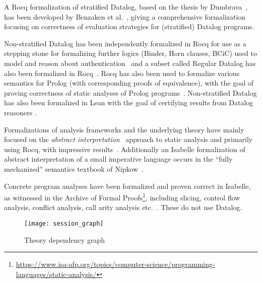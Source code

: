 \documentclass[10pt,a4paper]{article}
\begin{document}
A Rocq formalization of stratified Datalog, based on the thesis by
Dumbrava~\cite{DBLP:phd/hal/Dumbrava16}, has been developed by
Benzaken et al.~\cite{DBLP:conf/itp/BenzakenCD17}, giving a
comprehensive formalization focusing on correctness of evaluation
strategies for (stratified) Datalog programs. 

Non-stratified Datalog has been independently formalized in Rocq 
for use as a stepping stone for formalizing further logics (Binder,
Horn clauses, BCiC) used to model and reason about authentication~\cite{DBLP:conf/types/Whitehead06} and a subset called Regular Datalog has also been formalized in Rocq~\cite{DBLP:journals/tplp/BonifatiDA18}.
Rocq has also been used to
formalize various semantics for Prolog (with corresponding proofs of
equivalence), with the goal of proving correctness of
static analyses of Prolog programs~\cite{DBLP:conf/ppdp/KrienerKB13}.
Non-stratified Datalog has also been formalized in
Lean with the goal of certifying results from Datalog reasoners \cite{TGMK2025}.

Formalizations of analysis frameworks and the underlying theory have
mainly focused on the \emph{abstract
  interpretation}~\cite{DBLP:conf/popl/CousotC77} approach to static
analysis and primarily using Rocq, with impressive
results~\cite{DBLP:conf/itp/CacheraP10,DBLP:conf/popl/JourdanLBLP15}.
Additionally an Isabelle formalization of abstract interpretation
of a small imperative language occurs in the ``fully mechanized'' semantics
textbook of
Nipkow~\cite{DBLP:books/sp/NipkowK14,DBLP:conf/itp/Nipkow12}.

Concrete program analyses have been formalized and proven correct in
Isabelle, as witnessed in the Archive of Formal
Proofs\footnote{\url{https://www.isa-afp.org/topics/computer-science/programming-languages/static-analysis/}},
including slicing, control flow analysis, conflict analysis, call
arity analysis
etc.~\cite{Program-Conflict-Analysis-AFP,Slicing-AFP,DBLP:phd/dnb/Breitner16,HRB-Slicing-AFP,Shivers-CFA-AFP,DBLP:conf/sas/LammichM08,RIPEMD-160-SPARK-AFP,Call_Arity-AFP,Dominance_CHK-AFP,DBLP:conf/tphol/WasserrabL08,DBLP:conf/pldi/WasserrabLS09}.
These do not use Datalog.

\begin{figure}
\begin{center}
  \texttt{[image: session\_graph]}
\end{center}
\caption{Theory dependency graph}
\label{fig:thys}
\end{figure}

\newpage





\end{document}
